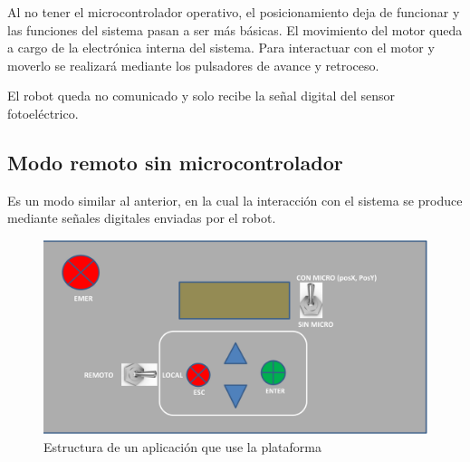 Al no tener el microcontrolador operativo, el posicionamiento deja de funcionar y las funciones del
sistema pasan a ser más básicas. El movimiento del motor queda a cargo de la electrónica interna del
sistema. Para interactuar con el motor y moverlo se realizará mediante los pulsadores de avance y 
retroceso.

El robot queda no comunicado y solo recibe la señal digital del sensor fotoeléctrico.

\subsection{Modo remoto sin microcontrolador}\label{subsec-04}

Es un modo similar al anterior, en la cual la interacción con el sistema se produce mediante señales
digitales enviadas por el robot.

\begin{figure}[htbp]
	\centering
	\includegraphics[width=\linewidth]{01-introduccion/botonera.jpg}
	\caption{Estructura de un aplicación que use la plataforma}
	\label{fig:figura1}
	\end{figure}
	

